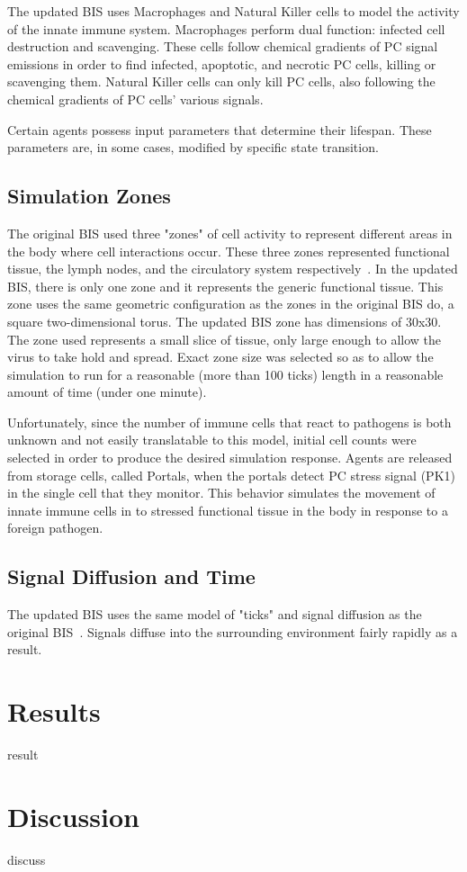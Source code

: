 \documentclass[10pt,conference]{IEEEtran}
\begin{document}
\indent
The updated BIS uses Macrophages and Natural Killer cells to model the activity
of the innate immune system. Macrophages perform dual function: infected cell
destruction and scavenging. These cells follow chemical gradients of PC signal
emissions in order to find infected, apoptotic, and necrotic PC cells, killing
or scavenging them. Natural Killer cells can only kill PC cells, also following
the chemical gradients of PC cells' various signals.

\indent
Certain agents possess input parameters that determine their lifespan. These
parameters are, in some cases, modified by specific state transition.

\subsection{Simulation Zones}
The original BIS used three "zones" of cell activity to represent different
areas in the body where cell interactions occur. These three zones represented
functional tissue, the lymph nodes, and the circulatory system
respectively~\cite{Folcik:2007}. In the updated BIS, there is only one zone and
it represents the generic functional tissue. This zone uses the same geometric
configuration as the zones in the original BIS do, a square two-dimensional
torus. The updated BIS zone has dimensions of 30x30. The zone used represents a
small slice of tissue, only large enough to allow the virus to take hold and
spread. Exact zone size was selected so as to allow the simulation to run for a
reasonable (more than 100 ticks) length in a reasonable amount of time (under
one minute).

\indent
Unfortunately, since the number of immune cells that react to pathogens is both
unknown and not easily translatable to this model, initial cell counts were
selected in order to produce the desired simulation response. Agents are
released from storage cells, called Portals, when the portals detect PC stress
signal (PK1) in the single cell that they monitor. This behavior simulates the
movement of innate immune cells in to stressed functional tissue in the body in
response to a foreign pathogen.

\subsection{Signal Diffusion and Time}
The updated BIS uses the same model of "ticks" and signal diffusion as the
original BIS~\cite{Folcik:2007}. Signals diffuse into the surrounding
environment fairly rapidly as a result.


\noindent

\section{Results}
\noindent
result

\section{Discussion}
\noindent
discuss



\end{document}
